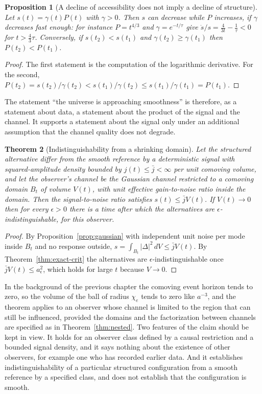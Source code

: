 \documentclass[11pt,oneside]{book}
\newtheorem{theorem}{Theorem}[chapter]
\newtheorem{proposition}[theorem]{Proposition}
\theoremstyle{definition}
\theoremstyle{remark}
\begin{document}
\begin{proposition}[A decline of accessibility does not imply a decline of structure]\label{prop:decline}
Let $s(t)=\gamma(t)P(t)$ with $\gamma>0$. Then $s$ can decrease while $P$ increases, if $\gamma$ decreases fast enough: for instance $P=t^{4/3}$ and $\gamma=e^{-t/\tau}$ give $\dot s/s=\tfrac4{3t}-\tfrac1\tau<0$ for $t>\tfrac43\tau$. Conversely, if $s(t_2)<s(t_1)$ and $\gamma(t_2)\geq\gamma(t_1)$ then $P(t_2)<P(t_1)$.
\end{proposition}

\begin{proof}
The first statement is the computation of the logarithmic derivative. For the second, $P(t_2)=s(t_2)/\gamma(t_2)<s(t_1)/\gamma(t_2)\leq s(t_1)/\gamma(t_1)=P(t_1)$.
\end{proof}

The statement ``the universe is approaching smoothness'' is therefore, as a statement about data, a statement about the product of the signal and the channel. It supports a statement about the signal only under an additional assumption that the channel quality does not degrade.

\begin{theorem}[Indistinguishability from a shrinking domain]\label{thm:indist}
Let the structured alternative differ from the smooth reference by a deterministic signal with squared-amplitude density bounded by $j(t)\leq\bar j<\infty$ per unit comoving volume, and let the observer's channel be the Gaussian channel restricted to a comoving domain $B_t$ of volume $V(t)$, with unit effective gain-to-noise ratio inside the domain. Then the signal-to-noise ratio satisfies $s(t)\leq\bar jV(t)$. If $V(t)\to0$ then for every $\epsilon>0$ there is a time after which the alternatives are $\epsilon$-indistinguishable, for this observer.
\end{theorem}

\begin{proof}
By Proposition~\ref{prop:gaussian} with independent unit noise per mode inside $B_t$ and no response outside, $s=\int_{B_t}|\Delta|^2\,dV\leq\bar jV(t)$. By Theorem~\ref{thm:exact-crit} the alternatives are $\epsilon$-indistinguishable once $\bar jV(t)\leq a_\epsilon^2$, which holds for large $t$ because $V\to0$.
\end{proof}

In the background of the previous chapter the comoving event horizon tends to zero, so the volume of the ball of radius $\chi_e$ tends to zero like $a^{-3}$, and the theorem applies to an observer whose channel is limited to the region that can still be influenced, provided the domains and the factorization between channels are specified as in Theorem~\ref{thm:nested}. Two features of the claim should be kept in view. It holds for an observer class defined by a causal restriction and a bounded signal density, and it says nothing about the existence of other observers, for example one who has recorded earlier data. And it establishes indistinguishability of a particular structured configuration from a smooth reference by a specified class, and does not establish that the configuration is smooth.
\end{document}
